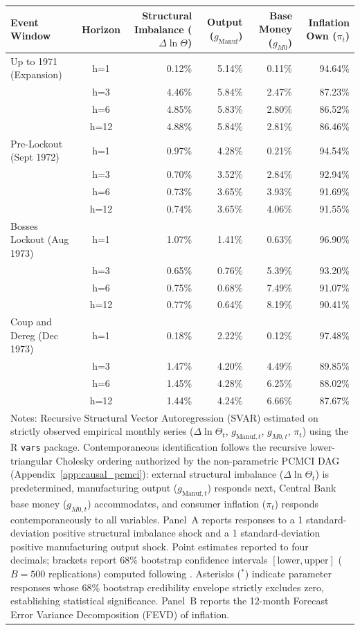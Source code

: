 \begin{table}[htbp]
{\begin{tabular}{@{}l c rrrr@{}}
\hline
Event Window & Horizon & Structural Imbalance ($\Delta \ln \Theta$) & Output ($g_{\text{Manuf}}$) & Base Money ($g_{M0}$) & Inflation Own ($\pi_t$) \\
\hline
Up to 1971 (Expansion) & h=1 & 0.12\% & 5.14\% & 0.11\% & 94.64\% \\
 & h=3 & 4.46\% & 5.84\% & 2.47\% & 87.23\% \\
 & h=6 & 4.85\% & 5.83\% & 2.80\% & 86.52\% \\
 & h=12 & 4.88\% & 5.84\% & 2.81\% & 86.46\% \\
\hline
Pre-Lockout (Sept 1972) & h=1 & 0.97\% & 4.28\% & 0.21\% & 94.54\% \\
 & h=3 & 0.70\% & 3.52\% & 2.84\% & 92.94\% \\
 & h=6 & 0.73\% & 3.65\% & 3.93\% & 91.69\% \\
 & h=12 & 0.74\% & 3.65\% & 4.06\% & 91.55\% \\
\hline
Bosses Lockout (Aug 1973) & h=1 & 1.07\% & 1.41\% & 0.63\% & 96.90\% \\
 & h=3 & 0.65\% & 0.76\% & 5.39\% & 93.20\% \\
 & h=6 & 0.75\% & 0.68\% & 7.49\% & 91.07\% \\
 & h=12 & 0.77\% & 0.64\% & 8.19\% & 90.41\% \\
\hline
Coup and Dereg (Dec 1973) & h=1 & 0.18\% & 2.22\% & 0.12\% & 97.48\% \\
 & h=3 & 1.47\% & 4.20\% & 4.49\% & 89.85\% \\
 & h=6 & 1.45\% & 4.28\% & 6.25\% & 88.02\% \\
 & h=12 & 1.44\% & 4.24\% & 6.66\% & 87.67\% \\
\hline
\hline\hline
\multicolumn{6}{p{15.2cm}}{\small Notes: Recursive Structural Vector Autoregression (SVAR) estimated on strictly observed empirical monthly series ($\Delta \ln \Theta_t$, $g_{\text{Manuf},t}$, $g_{M0,t}$, $\pi_t$) using the R \texttt{vars} package. Contemporaneous identification follows the recursive lower-triangular Cholesky ordering authorized by the non-parametric PCMCI DAG (Appendix~\ref{app:causal_pcmci}): external structural imbalance ($\Delta \ln \Theta_t$) is predetermined, manufacturing output ($g_{\text{Manuf},t}$) responds next, Central Bank base money ($g_{M0,t}$) accommodates, and consumer inflation ($\pi_t$) responds contemporaneously to all variables. Panel~A reports responses to a 1 standard-deviation positive structural imbalance shock and a 1 standard-deviation positive manufacturing output shock. Point estimates reported to four decimals; brackets report 68\% bootstrap confidence intervals $[\text{lower}, \text{upper}]$ ($B=500$ replications) computed following \citet{SimsZha1999}. Asterisks ($^*$) indicate parameter responses whose 68\% bootstrap credibility envelope strictly excludes zero, establishing statistical significance. Panel~B reports the 12-month Forecast Error Variance Decomposition (FEVD) of inflation.}
\end{tabular}%
}
\end{table}
